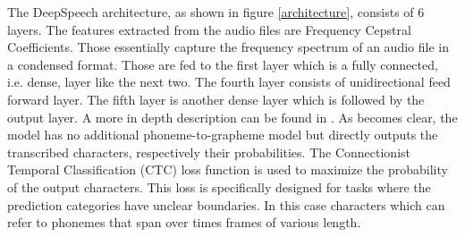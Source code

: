 The DeepSpeech architecture, as shown in figure \ref{architecture}, consists of 6 layers. The features extracted from the audio files are Frequency Cepstral Coefficients. Those essentially capture the frequency spectrum of an audio file in a condensed format. Those are fed to the first layer which is a fully connected, i.e. dense, layer like the next two. The fourth layer consists of unidirectional feed forward layer. The fifth layer is another dense layer which is followed by the output layer. A more in depth description can be found in \citet{Agarwal2019GermanES}. As becomes clear, the model has no additional phoneme-to-grapheme model but directly outputs the transcribed characters, respectively their probabilities. The Connectionist Temporal Classification (CTC) loss function is used to maximize the probability of the output characters. This loss is specifically designed for tasks where the prediction categories have unclear boundaries. In this case characters which can refer to phonemes that span over times frames of various length.  